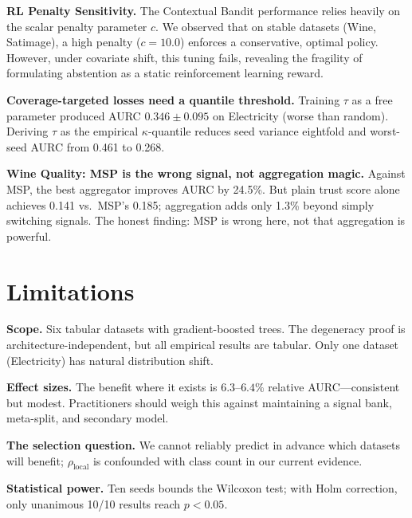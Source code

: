 \documentclass[conference]{IEEEtran}
\newcommand{\rholocal}{\rho_{\mathrm{local}}}
\begin{document}
\textbf{RL Penalty Sensitivity.} The Contextual Bandit performance relies heavily on the scalar penalty parameter $c$. We observed that on stable datasets (Wine, Satimage), a high penalty ($c=10.0$) enforces a conservative, optimal policy. However, under covariate shift, this tuning fails, revealing the fragility of formulating abstention as a static reinforcement learning reward.

\textbf{Coverage-targeted losses need a quantile threshold.} Training $\tau$ as a free parameter produced AURC $0.346 \pm 0.095$ on Electricity (worse than random). Deriving $\tau$ as the empirical $\kappa$-quantile reduces seed variance eightfold and worst-seed AURC from 0.461 to 0.268.

\textbf{Wine Quality: MSP is the wrong signal, not aggregation magic.} Against MSP, the best aggregator improves AURC by 24.5\%. But plain trust score alone achieves 0.141 vs.\ MSP's 0.185; aggregation adds only 1.3\% beyond simply switching signals. The honest finding: MSP is wrong here, not that aggregation is powerful.

\section{Limitations}
\label{sec:limitations}

\textbf{Scope.} Six tabular datasets with gradient-boosted trees. The degeneracy proof is architecture-independent, but all empirical results are tabular. Only one dataset (Electricity) has natural distribution shift.

\textbf{Effect sizes.} The benefit where it exists is $6.3$--$6.4\%$ relative AURC---consistent but modest. Practitioners should weigh this against maintaining a signal bank, meta-split, and secondary model.

\textbf{The selection question.} We cannot reliably predict in advance which datasets will benefit; $\rholocal$ is confounded with class count in our current evidence.

\textbf{Statistical power.} Ten seeds bounds the Wilcoxon test; with Holm correction, only unanimous 10/10 results reach $p{<}0.05$.

\end{document}
